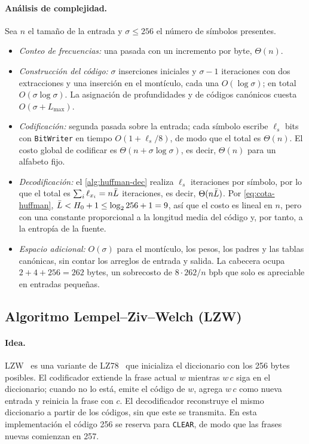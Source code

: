 \paragraph{Análisis de complejidad.} Sea $n$ el tamaño de la entrada y $\sigma \le 256$ el
número de símbolos presentes.
\begin{itemize}
  \item \emph{Conteo de frecuencias:} una pasada con un incremento por byte, $\Theta(n)$.
  \item \emph{Construcción del código:} $\sigma$ inserciones iniciales y $\sigma - 1$
        iteraciones con dos extracciones y una inserción en el montículo, cada una
        $O(\log\sigma)$; en total $O(\sigma\log\sigma)$. La asignación de profundidades y de
        códigos canónicos cuesta $O(\sigma + L_{\max})$.
  \item \emph{Codificación:} segunda pasada sobre la entrada; cada símbolo escribe $\ell_s$
        bits con \texttt{BitWriter} en tiempo $O(1 + \ell_s/8)$, de modo que el total es
        $\Theta(n)$. El costo global de codificar es $\Theta(n + \sigma\log\sigma)$, es decir,
        $\Theta(n)$ para un alfabeto fijo.
  \item \emph{Decodificación:} el \cref{alg:huffman-dec} realiza $\ell_s$ iteraciones por
        símbolo, por lo que el total es $\sum_i \ell_{x_i} = n\bar{L}$ iteraciones, es decir,
        $\Theta(n\bar{L})$. Por \eqref{eq:cota-huffman}, $\bar{L} < H_0 + 1 \le \log_2 256 + 1 = 9$,
        así que el costo es lineal en $n$, pero con una constante proporcional a la longitud
        media del código y, por tanto, a la entropía de la fuente.
  \item \emph{Espacio adicional:} $O(\sigma)$ para el montículo, los pesos, los padres y las
        tablas canónicas, sin contar los arreglos de entrada y salida. La cabecera ocupa
        $2 + 4 + 256 = 262$ bytes, un sobrecosto de $8\cdot 262/n$ bpb que solo es apreciable
        en entradas pequeñas.
\end{itemize}

\subsection{Algoritmo Lempel--Ziv--Welch (LZW)}
\label{sec:lzw}
\paragraph{Idea.} LZW~\cite{welch1984} es una variante de LZ78~\cite{ziv1978} que inicializa el
diccionario con los 256 bytes posibles. El codificador extiende la frase actual $w$ mientras
$w\,c$ siga en el diccionario; cuando no lo está, emite el código de $w$, agrega $w\,c$ como
nueva entrada y reinicia la frase con $c$. El decodificador reconstruye el mismo diccionario
a partir de los códigos, sin que este se transmita. En esta implementación el código 256 se
reserva para \texttt{CLEAR}, de modo que las frases nuevas comienzan en 257.

